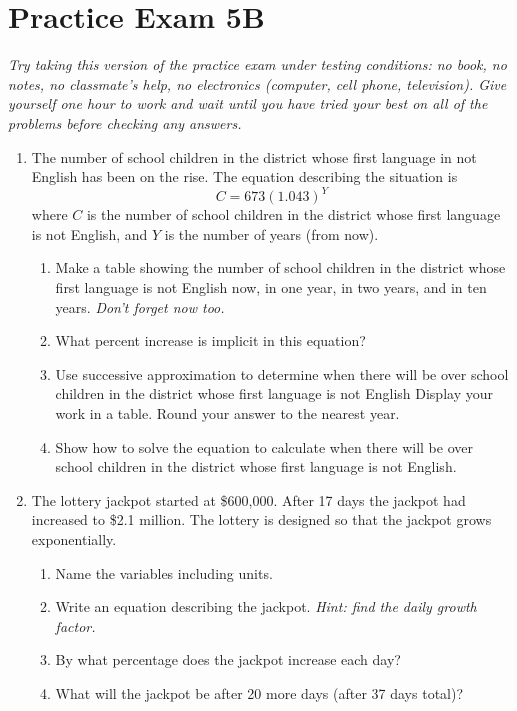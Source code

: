 
\section*{Practice Exam 5B}  

\emph{Try taking this version of the practice exam under testing conditions:  no book, no notes, no classmate's help, no electronics (computer, cell phone, television). Give yourself one hour to work and wait until you have tried your best on all of the problems before checking any answers.}

\noindent \hrulefill

\begin{enumerate}

\item The number of school children in the district whose first language in not English has been on the rise.  The equation describing the situation is $$C=673(1.043)^Y$$ where $C$ is the number of school children in the district whose first language is not English, and $Y$ is the number of years (from now).
\begin{enumerate}
\item Make a table showing the number of school children in the district whose first language is not English now, in one year, in two years, and in ten years. \emph{Don't forget now too.} 
\vfill
\vfill
\item What percent increase is implicit in this equation?
\vfill
\item Use successive approximation to determine when there will be over  school children in the district whose first language is not English Display your work in a table.  Round your answer to the nearest year. 
\vfill
\vfill
\item Show how to solve the equation to calculate when there will be over  school children in the district whose first language is not English. 
\vfill
\vfill
\end{enumerate}  

\newpage

\item The lottery jackpot started at \$600,000.  After 17 days the jackpot had increased to \$2.1 million.  The lottery is designed so that the jackpot grows exponentially.

\begin{enumerate}
\item Name the variables including units. 
\vfill
\item Write an equation describing the jackpot.  \emph{Hint:  find the daily growth factor.} 
\vfill
\vfill
\item By what percentage does the jackpot increase each day? 
\vfill
\item What will the jackpot be after 20 more days (after 37 days total)? 
\vfill
\end{enumerate} 


\end{enumerate}

